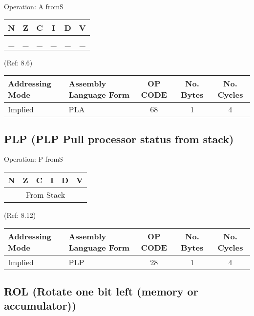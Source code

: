 \documentclass{article}
\begin{document}
  Operation:  A fromS
  \begin{table}[H]
  \centering
  \begin{tabular}{|c c c c c c|}
  \hline
  N&Z&C&I&D&V\\
  \hline
  \_ & \_ & \_ & \_ & \_ & \_\\
  \hline
  \end{tabular}
  \end{table}
                                 (Ref: 8.6)
  \begin{table}[H]
  \centering
  \begin{tabular}{|l|l|c|c|c|}
  \hline
    Addressing Mode& Assembly Language Form& OP CODE &No. Bytes&No. Cycles\\
  \hline
     Implied       &   PLA                 &    68   &    1    &    4     \\
  \hline
  \end{tabular}
  \end{table}


  \subsection{PLP (PLP Pull processor status from stack)}

  Operation:  P fromS
  \begin{table}[H]
  \centering
  \begin{tabular}{|c c c c c c|}
  \hline
  N&Z&C&I&D&V\\
  \hline
  \multicolumn{6}{|c|}{From Stack}\\
  \hline
  \end{tabular}
  \end{table}
                                 (Ref: 8.12)
  \begin{table}[H]
  \centering
  \begin{tabular}{|l|l|c|c|c|}
  \hline
    Addressing Mode& Assembly Language Form& OP CODE &No. Bytes&No. Cycles\\
  \hline
     Implied       &   PLP                 &    28   &    1    &    4     \\
  \hline
  \end{tabular}
  \end{table}


  \subsection{ROL (Rotate one bit left (memory or accumulator))}
\end{document}
